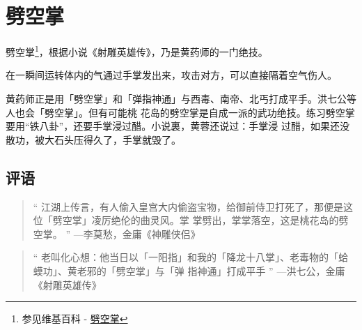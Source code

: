 \chapter{劈空掌}
劈空掌\footnote{参见维基百科 - \href{http://zh.wikipedia.org/wiki/\%E5\%8A\%88\%E7\%A9\%BA\%E6\%8E\%8C}{劈空掌}}，根据小说《射雕英雄传》，乃是黄药师的一门绝技。

在一瞬间运转体内的气通过手掌发出来，攻击对方，可以直接隔着空气伤人。

黄药师正是用「劈空掌」和「弹指神通」与西毒、南帝、北丐打成平手。洪七公等人也会「劈空掌」。但有可能桃
花岛的劈空掌是自成一派的武功绝技。练习劈空掌要用“铁八卦”，还要手掌浸过醋。小说裏，黄蓉还说过：手掌浸
过醋，如果还没散功，被大石头压得久了，手掌就毁了。

\section{评语}

\begin{quote}
  “ 江湖上传言，有人偷入皇宫大内偷盗宝物，给御前侍卫打死了，那便是这位「劈空掌」凌厉绝伦的曲灵风。掌
  掌劈出，掌掌落空，这是桃花岛的劈空掌。 ” —李莫愁，金庸《神雕侠侣》
\end{quote}

\begin{quote}
  “ 老叫化心想：他当日以「一阳指」和我的「降龙十八掌」、老毒物的「蛤蟆功」、黄老邪的「劈空掌」与「弹
  指神通」打成平手 ” —洪七公，金庸《射雕英雄传》
\end{quote}

